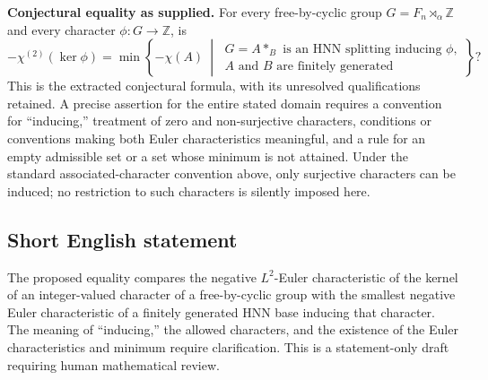 \documentclass[11pt]{article}
\newcommand{\Z}{\mathbb{Z}}
\begin{document}
\textbf{Conjectural equality as supplied.} For every free-by-cyclic group \(G=F_n\rtimes_\alpha\Z\) and every character \(\phi:G\to\Z\), is
\[
-\chi^{(2)}(\ker\phi)
=
\min\left\{
-\chi(A)\ \middle|\
\begin{gathered}
G=A*_B\text{ is an HNN splitting inducing }\phi,\\
A\text{ and }B\text{ are finitely generated}
\end{gathered}
\right\}?
\]
This is the extracted conjectural formula, with its unresolved qualifications retained. A precise assertion for the entire stated domain requires a convention for ``inducing,'' treatment of zero and non-surjective characters, conditions or conventions making both Euler characteristics meaningful, and a rule for an empty admissible set or a set whose minimum is not attained. Under the standard associated-character convention above, only surjective characters can be induced; no restriction to such characters is silently imposed here.
\subsection{Short English statement}
The proposed equality compares the negative \(L^2\)-Euler characteristic of the kernel of an integer-valued character of a free-by-cyclic group with the smallest negative Euler characteristic of a finitely generated HNN base inducing that character. The meaning of ``inducing,'' the allowed characters, and the existence of the Euler characteristics and minimum require clarification. This is a statement-only draft requiring human mathematical review.
\end{document}
